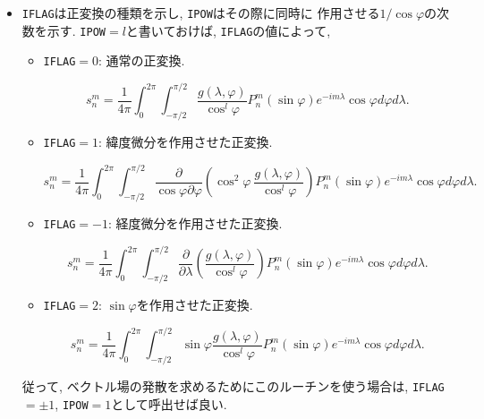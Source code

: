 \documentclass[a4j,fleqn]{jarticle}
\begin{document}
\begin{enumerate}
\begin{itemize}
\item {\tt IFLAG}は正変換の種類を示し, {\tt IPOW}はその際に同時に
    作用させる$1/\cos\varphi$の次数を示す. {\tt IPOW}$=l$と書いておけば,
    {\tt IFLAG}の値によって,    
    
   \begin{itemize}
    \item {\tt IFLAG}$=0$: 通常の正変換.

      \begin{equation}
        s^m_n=\frac1{4\pi}\int^{2\pi}_0\int^{\pi/2}_{-\pi/2}
        \frac{g(\lambda,\varphi)}{\cos^l\varphi}
	P^m_n(\sin\varphi)e^{-im\lambda}\cos\varphi d\varphi
        d\lambda .
      \end{equation}
      
  \item {\tt IFLAG}$=1$: 緯度微分を作用させた正変換.

      \begin{equation}
        s^m_n=\frac1{4\pi}\int^{2\pi}_0\int^{\pi/2}_{-\pi/2}
        \frac{\partial}{\cos\varphi\partial\varphi}\left(\cos^2\varphi
        \ \frac{g(\lambda,\varphi)}{\cos^l\varphi}
        \right)P^m_n(\sin\varphi)e^{-im\lambda}\cos\varphi d\varphi
        d\lambda .
      \end{equation}

    \item {\tt IFLAG}$=-1$: 経度微分を作用させた正変換.

      \begin{equation}
        s^m_n=\frac1{4\pi}\int^{2\pi}_0\int^{\pi/2}_{-\pi/2}
        \frac{\partial}{\partial\lambda}\left(
	\frac{g(\lambda,\varphi)}{\cos^l\varphi}
        \right)P^m_n(\sin\varphi)e^{-im\lambda}\cos\varphi d\varphi
        d\lambda .
      \end{equation}

    \item {\tt IFLAG}$=2$: $\sin\varphi$を作用させた正変換.

      \begin{equation}
        s^m_n=\frac1{4\pi}\int^{2\pi}_0\int^{\pi/2}_{-\pi/2}
        \sin\varphi\frac{g(\lambda,\varphi)}{\cos^l\varphi}
        P^m_n(\sin\varphi)e^{-im\lambda}\cos\varphi d\varphi
        d\lambda .
      \end{equation}
     
  \end{itemize}

    従って, ベクトル場の発散を求めるためにこのルーチンを使う場合は,
    {\tt IFLAG}$=\pm 1$, {\tt IPOW}$=1$として呼出せば良い.

  \end{itemize}
  
\end{enumerate}  
\end{document}
